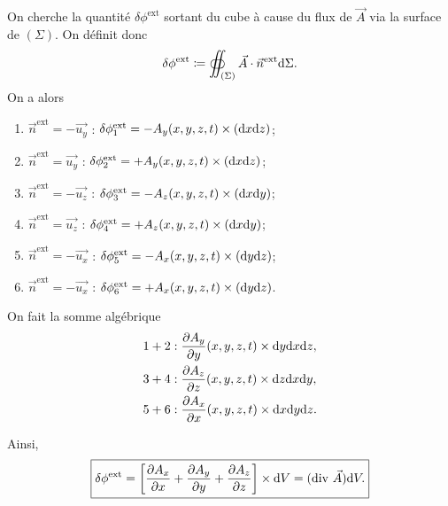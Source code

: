         On cherche la quantité $\delta \phi^{\text{ext}}$ sortant du cube à cause du flux de $\vec{A}$ via la surface de $(\Sigma)$.
        On définit donc 
        \begin{equation}
            \delta \phi^{\text{ext}}\coloneqq\oiint_{(\Sigma)}\vec{A}\cdot\vec{n}^{\text{ext}}\mathrm{d}\Sigma.
        \end{equation}
        On a alors
        \begin{enumerate}[label=(\arabic*)]
            \item $\vec{n}^{\text{ext}}=-\vec{u_y}$ : $\delta \phi_{1}^{\text{ext}}=-A_y(x,y,z,t)\times(\mathrm{d} x\mathrm{d} z)$;
            \item $\vec{n}^{\text{ext}}=\vec{u_y}$ : $\delta \phi_{2}^{\text{ext}}=+A_y(x,y,z,t)\times(\mathrm{d} x\mathrm{d} z)$;
            \item $\vec{n}^{\text{ext}}=-\vec{u_z}$ : $\delta \phi_{3}^{\text{ext}}=-A_z(x,y,z,t)\times(\mathrm{d} x\mathrm{d} y)$;
            \item $\vec{n}^{\text{ext}}=\vec{u_z}$ : $\delta \phi_{4}^{\text{ext}}=+A_z(x,y,z,t)\times(\mathrm{d} x\mathrm{d} y)$;
            \item $\vec{n}^{\text{ext}}=-\vec{u_x}$ : $\delta \phi_{5}^{\text{ext}}=-A_x(x,y,z,t)\times(\mathrm{d} y\mathrm{d} z)$;
            \item $\vec{n}^{\text{ext}}=-\vec{u_x}$ : $\delta \phi_{6}^{\text{ext}}=+A_x(x,y,z,t)\times(\mathrm{d} y\mathrm{d} z)$.
        \end{enumerate}

        On fait la somme algébrique
        \begin{equation}
            \begin{aligned}
                1+2 &: \frac{\partial A_y}{\partial y}(x,y,z,t)\times\mathrm{d} y\mathrm{d} x\mathrm{d} z,\\
                3+4 &: \frac{\partial A_z}{\partial z}(x,y,z,t)\times\mathrm{d} z\mathrm{d} x\mathrm{d} y,\\
                5+6 &: \frac{\partial A_x}{\partial x}(x,y,z,t)\times\mathrm{d} x\mathrm{d} y\mathrm{d} z.
            \end{aligned}
        \end{equation}

        Ainsi,
        \begin{equation}
            \boxed{
                \delta \phi^{\text{ext}}=\left[
                    \frac{\partial A_x}{\partial x}+\frac{\partial A_y}{\partial y}+\frac{\partial A_z}{\partial z}
                \right]\times \mathrm{d} V=(\mathrm{div}~\vec{A})\mathrm{d} V.
            }
        \end{equation}

